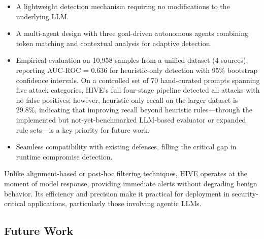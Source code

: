 \documentclass[manuscript,screen,review]{acmart}
\begin{document}
\begin{itemize}
\item A lightweight detection mechanism requiring no modifications to the underlying LLM.
\item A multi-agent design with three goal-driven autonomous agents combining token matching and contextual analysis for adaptive detection.
\item Empirical evaluation on 10{,}958 samples from a unified dataset (4 sources), reporting AUC-ROC = 0.636 for heuristic-only detection with 95\% bootstrap confidence intervals. On a controlled set of 70 hand-curated prompts spanning five attack categories, HIVE's full four-stage pipeline detected all attacks with no false positives; however, heuristic-only recall on the larger dataset is 29.8\%, indicating that improving recall beyond heuristic rules---through the implemented but not-yet-benchmarked LLM-based evaluator or expanded rule sets---is a key priority for future work.
\item Seamless compatibility with existing defenses, filling the critical gap in runtime compromise detection.
\end{itemize}

Unlike alignment-based or post-hoc filtering techniques, HIVE operates at the moment of model response, providing immediate alerts without degrading benign behavior. Its efficiency and precision make it practical for deployment in security-critical applications, particularly those involving agentic LLMs.

\subsection{Future Work}
\end{document}

